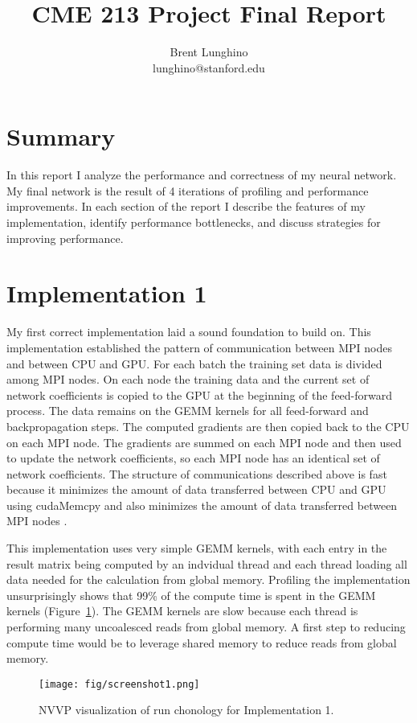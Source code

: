 \documentclass[12pt]{article}
\title{CME 213 Project Final Report}
\author{Brent Lunghino\\lunghino@stanford.edu}
\begin{document}
	
\maketitle

\section{Summary}

In this report I analyze the performance and correctness of my neural network. My final network is the result of 4 iterations of profiling and performance improvements. In each section of the report I describe the features of my implementation, identify performance bottlenecks, and discuss strategies for improving performance.

\section{Implementation 1}

My first correct implementation laid a sound foundation to build on. This implementation established the pattern of communication between MPI nodes and between CPU and GPU. For each batch the training set data is divided among MPI nodes. On each node the training data and the current set of network coefficients is copied to the GPU at the beginning of the feed-forward process. The data remains on the GEMM kernels for all feed-forward and backpropagation steps. The computed gradients are then copied back to the CPU on each MPI node. The gradients are summed on each MPI node and then used to update the network coefficients, so each MPI node has an identical set of network coefficients. The structure of communications described above is fast because it minimizes the amount of data transferred between CPU and GPU using cudaMemcpy and also minimizes the amount of data transferred between MPI nodes .

This implementation uses very simple GEMM kernels, with each entry in the result matrix being computed by an indvidual thread and each thread loading all data needed for the calculation from global memory. Profiling the implementation unsurprisingly shows that 99\% of the compute time is spent in the GEMM kernels (Figure~\ref{fig:screenshot1}). The GEMM kernels are slow because each thread is performing many uncoalesced reads from global memory. A first step to reducing compute time would be to leverage shared memory to reduce reads from global memory.

\begin{figure}[htb]
	\begin{center}
		\texttt{[image: fig/screenshot1.png]}
		\caption{NVVP visualization of run chonology for Implementation 1.}
		\label{fig:screenshot1}
	\end{center}
\end{figure}
\end{document}
